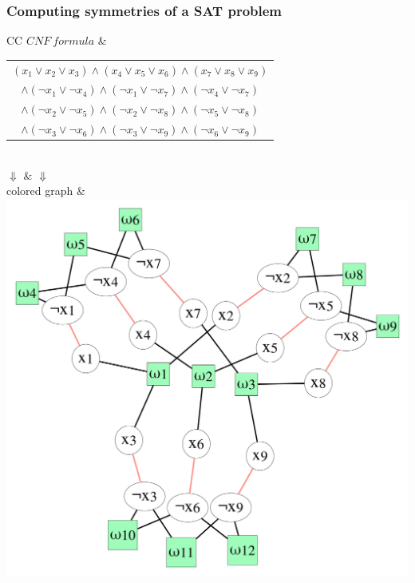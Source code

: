 \documentclass{beamer}
\begin{document}
\begin{frame}
	\frametitle{Computing symmetries of a SAT problem}

	\begin{tabular}{CC}
		$CNF\ formula$ &{\scriptsize
			\begin{tabular}{c}
				$(x_1 \lor x_2 \lor x_3) \land
				(x_4 \lor x_5 \lor x_6) \land
				(x_7 \lor x_8 \lor x_9) $\\
				$\land (\neg x_1 \lor \neg x_4) \land
				(\neg x_1 \lor \neg x_7) \land
				(\neg x_4 \lor \neg x_7)$\\
				$\land (\neg x_2 \lor \neg x_5) \land
				(\neg x_2 \lor \neg x_8) \land
				(\neg x_5 \lor \neg x_8)$ \\
				$\land (\neg x_3 \lor \neg x_6) \land
				(\neg x_3 \lor \neg x_9) \land
				(\neg x_6 \lor \neg x_9)$\\
		\end{tabular}}\\
		\only<2> {
			$\Downarrow$ & $\Downarrow$  \\

			colored graph &
			\includegraphics[scale=0.1]{images/graph}\\ \\
		}


\end{tabular}
\end{frame}
\end{document}
